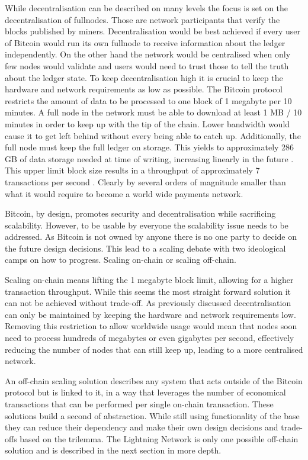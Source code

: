 \documentclass[final]{fhnwreport}       %
\begin{document}
While decentralisation can be described on many levels the focus is set on the decentralisation of \glspl{fullnode}. Those are network participants that verify the blocks published by miners. Decentralisation would be best achieved if  every user of Bitcoin would run its own \gls{fullnode} to receive information about the ledger independently. On the other hand the network would be centralised when only few nodes would validate and users would need to trust those to tell the truth about the ledger state. To keep decentralisation high it is crucial to keep the hardware and network requirements as low as possible. The Bitcoin protocol restricts the amount of data to be processed to one block of 1 megabyte per 10 minutes. A full node in the network must be able to download at least 1 MB / 10 minutes in order to keep up with the tip of the chain. Lower bandwidth would cause it to get left behind without every being able to catch up. Additionally, the full node must keep the full ledger on storage. This yields to approximately 286 GB of data storage needed at time of writing, increasing linearly in the future \citep{noauthor_block-size_nodate}. This upper limit block size results in a throughput of approximately 7 transactions per second \citep{poon_bitcoin_2016}. Clearly by several orders of magnitude smaller than what it would require to become a world wide payments network. 

Bitcoin, by design, promotes security and decentralisation while sacrificing scalability. However, to be usable by everyone the scalability issue needs to be addressed. As Bitcoin is not owned by anyone there is no one party to decide on the future design decisions. This lead to a scaling debate with two ideological camps on how to progress. Scaling on-chain or scaling off-chain.

Scaling on-chain means lifting the 1 megabyte block limit, allowing for a higher transaction throughput. While this seems the most straight forward solution it can not be achieved without trade-off. As previously discussed decentralisation can only be maintained by keeping the hardware and network requirements low. Removing this restriction to allow worldwide usage would mean that nodes soon need to process hundreds of megabytes or even gigabytes per second, effectively reducing the number of nodes that can still keep up, leading to a more centralised network. 

An off-chain scaling solution describes any system that acts outside of the Bitcoin protocol but is linked to it, in a way that leverages the number of economical transactions that can be performed per single on-chain transaction. These solutions build a \gls{second} of abstraction. While still using functionality of the \gls{base} they can reduce their dependency and make their own design decisions and trade-offs based on the \gls{trilemma}. The Lightning Network is only one possible off-chain solution and is described in the next section in more depth. 
\end{document}
